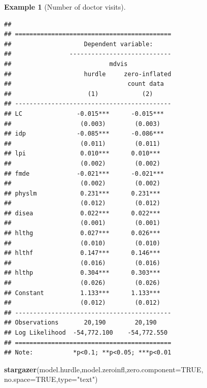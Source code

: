 \documentclass[
  12pt,
]{book}
\newenvironment{Shaded}{\begin{snugshade}}{\end{snugshade}}
\newcommand{\AttributeTok}[1]{\textcolor[rgb]{0.13,0.29,0.53}{#1}}
\newcommand{\ConstantTok}[1]{\textcolor[rgb]{0.56,0.35,0.01}{#1}}
\newcommand{\FunctionTok}[1]{\textcolor[rgb]{0.13,0.29,0.53}{\textbf{#1}}}
\newcommand{\NormalTok}[1]{#1}
\newcommand{\StringTok}[1]{\textcolor[rgb]{0.31,0.60,0.02}{#1}}
\theoremstyle{definition}
\theoremstyle{definition}
\newtheorem{example}{Example}[chapter]
\theoremstyle{definition}
\theoremstyle{definition}
\theoremstyle{remark}
\begin{document}
\begin{example}[Number of doctor visits]
\begin{verbatim}
## 
## ===========================================
##                    Dependent variable:     
##                ----------------------------
##                           mdvis            
##                    hurdle     zero-inflated
##                                count data  
##                     (1)            (2)     
## -------------------------------------------
## LC               -0.015***      -0.015***  
##                   (0.003)        (0.003)   
## idp              -0.085***      -0.086***  
##                   (0.011)        (0.011)   
## lpi               0.010***      0.010***   
##                   (0.002)        (0.002)   
## fmde             -0.021***      -0.021***  
##                   (0.002)        (0.002)   
## physlm            0.231***      0.231***   
##                   (0.012)        (0.012)   
## disea             0.022***      0.022***   
##                   (0.001)        (0.001)   
## hlthg             0.027***      0.026***   
##                   (0.010)        (0.010)   
## hlthf             0.147***      0.146***   
##                   (0.016)        (0.016)   
## hlthp             0.304***      0.303***   
##                   (0.026)        (0.026)   
## Constant          1.133***      1.133***   
##                   (0.012)        (0.012)   
## -------------------------------------------
## Observations       20,190        20,190    
## Log Likelihood  -54,772.100    -54,772.550 
## ===========================================
## Note:           *p<0.1; **p<0.05; ***p<0.01
\end{verbatim}

\begin{Shaded}
\begin{Highlighting}[]
\FunctionTok{stargazer}\NormalTok{(model.hurdle,model.zeroinfl,}\AttributeTok{zero.component=}\ConstantTok{TRUE}\NormalTok{,}
          \AttributeTok{no.space=}\ConstantTok{TRUE}\NormalTok{,}\AttributeTok{type=}\StringTok{"text"}\NormalTok{)}
\end{Highlighting}
\end{Shaded}


\end{example}
\end{document}
